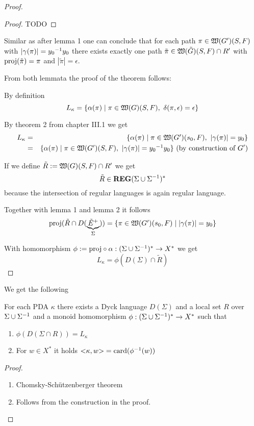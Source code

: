\begin{proof}
\begin{proof}
TODO
\end{proof}

Similar as after lemma 1 one can conclude that for each path $\pi \in
\mbox{$\mathfrak{W}({G'})$}(S, F)$ with $|\gamma(\pi)| = \mbox{${y_0}^{-1}$}y_0$ there exists exactly one
path $\tilde{\pi} \in \mbox{$\mathfrak{W}({\tilde{G}})$}(S, F) \cap R'$ with
$\mathrm{proj}({\tilde{\pi}}) = \pi$ and $|\tilde{\pi}| = \epsilon$.

From both lemmata the proof of the theorem follows:

By definition
\[ L_\kappa = \mbox{$\{\alpha(\pi) \mid \pi \in \mbox{$\mathfrak{W}({G})$}(S, F),\ \delta(\pi,
\epsilon) = \epsilon\}$} \]

By theorem 2 from chapter III.1 we get
\begin{eqnarray*}
L_\kappa &=& \mbox{$\{\alpha(\pi) \mid \pi \in \mbox{$\mathfrak{W}({G'})$}(s_0, F),\
|\gamma(\pi)| = y_0\}$} \\
&=& \mbox{$\{\alpha(\pi) \mid \pi \in \mbox{$\mathfrak{W}({G'})$}(S, F),\
|\gamma(\pi)| = \mbox{${y_0}^{-1}$} y_0\}$}\text{ (by construction of $G'$)}
\end{eqnarray*}

If we define $\tilde{R} := \mbox{$\mathfrak{W}({G})$}(S, F) \cap R'$ we get
\[ \tilde{R} \in \mbox{{\bf REG}}(\Sigma \cup {\Sigma}^{-1})^* \]
because the intersection of regular languages is again regular language.

\medskip
Together with lemma 1 and lemma 2 it follows
\[ \mathrm{proj}({\tilde{R} \cap D(\underbrace{\tilde{E}^+}_{\Sigma})}) = \mbox{$\{\pi \in
\mbox{$\mathfrak{W}({G'})$}(s_0, F) \mid |\gamma(\pi)| = y_0\}$} \]

With homomorphism $\phi := \mathrm{proj} \circ \alpha : (\Sigma \cup {\Sigma}^{-1})^*
\to X^*$ we get
\[ L_\kappa = \phi(D(\Sigma) \cap \tilde{R}) \]
\end{proof}

\bigskip
We get the following
\begin{corollary}
For each PDA $\kappa$ there exists a Dyck language $D(\Sigma)$ and a local set
$R$ over $\Sigma \cup {\Sigma}^{-1}$ and a monoid homomorphism $\phi:
(\Sigma \cup {\Sigma}^{-1})^* \to X^*$ such that
\begin{enumerate}
  \item $\phi(D(\Sigma\cap R)) = L_\kappa$
  \item For $w\in X^*$ it holds ${<}\kappa, w{>} = \mathrm{card}({\phi^{-1}(w)})$
\end{enumerate}
\end{corollary}

\begin{proof}\ 

\begin{enumerate}
  \item Chomsky-Schützenberger theorem
  \item Follows from the construction in the proof.
\end{enumerate}
\end{proof}

